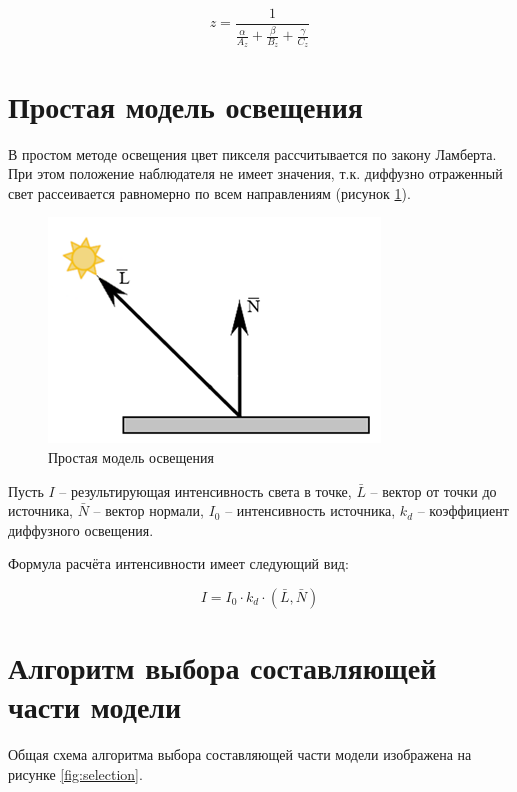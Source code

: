 \begin{equation}
	z=\frac{1}{\frac{\alpha}{A_z}+\frac{\beta}{B_z}+\frac{\gamma}{C_z}}
\end{equation}

\section{Простая модель освещения}

В простом методе освещения цвет пикселя рассчитывается по закону Ламберта. При этом положение наблюдателя не имеет значения, т.к. диффузно отраженный свет рассеивается равномерно по всем направлениям (рисунок \ref{fig:simple_light}).

\begin{figure}[h]
	\centering
	\includegraphics[scale=0.8]{inc/img/simple_light.png}
	\caption{Простая модель освещения}
	\label{fig:simple_light}
\end{figure} 

Пусть 
$ I $ -- результирующая интенсивность света в точке,
$ \bar{L} $ -- вектор от точки до источника,
$ \bar{N} $ -- вектор нормали,
$ I_0 $ -- интенсивность источника,
$ k_d $ -- коэффициент диффузного освещения.

Формула расчёта интенсивности имеет следующий вид:

\begin{equation}
	I=I_0 \cdot k_d \cdot \left(\bar{L},\bar{N}\right)
\end{equation}

\section{Алгоритм выбора составляющей части модели}

Общая схема алгоритма выбора составляющей части модели изображена на рисунке \ref{fig:selection}.

